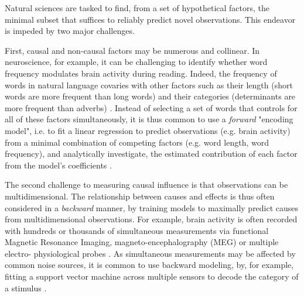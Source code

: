 Natural sciences are tasked to find, from a set of hypothetical factors, the
minimal subset that suffices to reliably predict novel observations. This
endeavor is impeded by two major challenges.

First, causal and non-causal factors may be numerous and collinear.
In neuroscience, for
example, it can be challenging to identify whether word frequency modulates
brain activity during reading. Indeed, the
frequency of words in natural language covaries with other factors such as their
length (short words are more frequent than long words) and their categories
(determinants are more frequent than adverbs)
\citep{kutas2011thirty,pegado2014timing}. Instead of selecting a set of words
that controls for all of these factors simultaneously, it is thus common to use
a \emph{forward} "encoding model", i.e. to fit a linear regression to predict observations
(e.g. brain activity) from a minimal combination of competing factors (e.g.
word length, word frequency), and analytically investigate,
the estimated contribution of each factor from the model's coefficients
\citep{friston1994statistical,naselaris2011encoding,weichwald2015causal,
king2018encoding,huth2016natural}.

The second challenge to measuring causal influence is that observations can be
multidimensional. The relationship between causes and effects is thus often
considered in a \emph{backward} manner, by training models to maximally predict causes
from multidimensional observations. For example, brain activity is often
recorded with hundreds or thousands of simultaneous measurements via functional
Magnetic Resonance Imaging, magneto-encephalography (MEG) or multiple electro-
physiological probes \citep{friston1994statistical,steinmetz2018challenges}.
As simultaneous measurements may be affected by common noise sources, it is
common to use backward
modeling, by, for example, fitting a support vector machine across multiple
sensors to decode the category of a stimulus \citep{norman2006beyond,cichy2014resolving,
kriegeskorte2008representational}.

